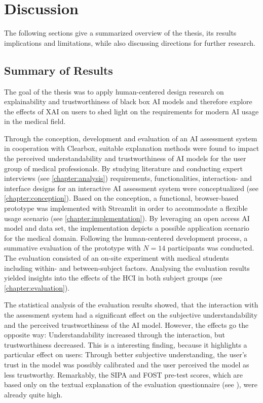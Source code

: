 \documentclass[11pt,a4paper,english]{scrreprt}
\begin{document}
\newpage
\chapter{Discussion}
The following sections give a summarized overview of the thesis, its results implications and limitations, while also discussing directions for further research.

\section{Summary of Results}
The goal of the thesis was to apply human-centered design research on explainability and trustworthiness of black box AI models and therefore explore the effects of XAI on users to shed light on the requirements for modern AI usage in the medical field.

Through the conception, development and evaluation of an AI assessment system in cooperation with Clearbox, suitable explanation methods were found to impact the perceived understandability and trustworthiness of AI models for the user group of medical professionals. By studying literature and conducting expert interviews (see \autoref{chapter:analysis}) requirements, functionalities, interaction- and interface designs for an interactive AI assessment system were conceptualized (see \autoref{chapter:conception}). Based on the conception, a functional, browser-based prototype was implemented with Streamlit \parencite{streamlit_website} in order to accommodate a flexible usage scenario (see \autoref{chapter:implementation}). By leveraging an open access AI model and data set, the implementation depicts a possible application scenario for the medical domain. Following the human-centered development process, a summative evaluation of the prototype with $\textit{N}=14$ participants was conducted. The evaluation consisted of an on-site experiment with medical students including within- and between-subject factors. Analysing the evaluation results yielded insights into the effects of the HCI in both subject groups (see \autoref{chapter:evaluation}).

The statistical analysis of the evaluation results showed, that the interaction with the assessment system had a significant effect on the subjective understandability and the perceived trustworthiness of the AI model. However, the effects go the opposite way: Understandability increased through the interaction, but trustworthiness decreased. This is a interesting finding, because it highlights a particular effect on users: Through better subjective understanding, the user's trust in the model was possibly calibrated and the user perceived the model as less trustworthy. Remarkably, the SIPA and FOST pre-test scores, which are based only on the textual explanation of the evaluation questionnaire (see ), were already quite high.
\end{document}
